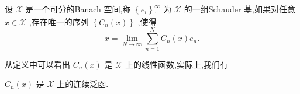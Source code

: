 \documentclass[lang=cn,newtx,10pt,scheme=chinese,thmcnt=chapter]{elegantbook}
\begin{document}
\begin{definition}
     设 \(\mathcal{X}\) 是一个可分的Banach 空间,称 \({\left\{  {e}_{i}\right\}  }_{1}^{\infty }\) 为 \(\mathcal{X}\) 的一组Schauder 基,如果对任意 \(x \in  \mathcal{X}\) ,存在唯一的序列 \(\left\{  {{C}_{n}\left( x\right) }\right\}\) ,使得
\begin{equation*}
x = \mathop{\lim }\limits_{{N \rightarrow  \infty }}\mathop{\sum }\limits_{{n = 1}}^{N}{C}_{n}\left( x\right) {e}_{n}.
\end{equation*}
\end{definition}


从定义中可以看出 \({C}_{n}\left( x\right)\) 是 \(\mathcal{X}\) 上的线性函数,实际上,我们有
\begin{lemma}
     \({C}_{n}\left( x\right)\) 是 \(\mathcal{X}\) 上的连续泛函.
\end{lemma}
\end{document}
